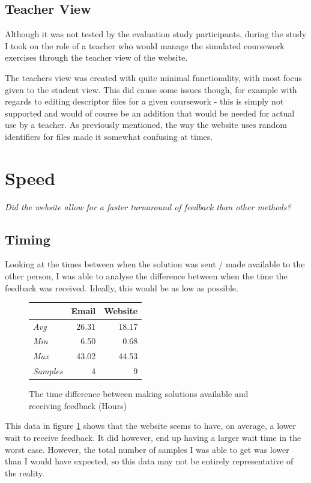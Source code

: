 \documentclass[a4paper,11pt]{report}
\begin{document}
\subsection{Teacher View}
Although it was not tested by the evaluation study participants, during the study I took on the role of a teacher who would manage the simulated coursework exercises through the teacher view of the website.\par
The teachers view was created with quite minimal functionality, with most focus given to the student view. This did cause some issues though, for example with regards to editing descriptor files for a given coursework - this is simply not supported and would of course be an addition that would be needed for actual use by a teacher. As previously mentioned, the way the website uses random identifiers for files made it somewhat confusing at times.

\section{Speed}
\textit{Did the website allow for a faster turnaround of feedback than other methods?}\par
\subsection{Timing}
Looking at the times between when the solution was sent / made available to the other person, I was able to analyse the difference between when the time the feedback was received. Ideally, this would be as low as possible.
\begin{figure}[ht]
\centering
\begin{tabular}{l||r|r}
 & \textbf{Email} & \textbf{Website}\\
\hline
\textit{Avg} & 26.31 & 18.17 \\
\textit{Min} & 6.50 & 0.68 \\
\textit{Max} & 43.02 & 44.53 \\
\textit{Samples} & 4 & 9 \\
\end{tabular}
\caption{The time difference between making solutions available and receiving feedback (Hours)}
\label{tab:timing}
\end{figure}
This data in figure \ref{tab:timing} shows that the website seems to have, on average, a lower wait to receive feedback. It did however, end up having a larger wait time in the worst case. However, the total number of samples I was able to get was lower than I would have expected, so this data may not be entirely representative of the reality.
\end{document}
